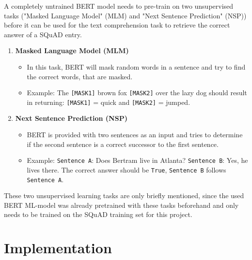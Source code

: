         A completely untrained BERT model needs to pre-train on two unsupervised tasks ("Masked Language Model" (MLM) and "Next Sentence Prediction" (NSP)) before it can be used for the text comprehension task to retrieve the correct answer of a SQuAD entry. 
        
        \begin{enumerate}
            \item \textbf{Masked Language Model (MLM)}
            \begin{itemize}
                \item In this task, BERT will mask random words in a sentence and try to find the correct words, that are masked.
                \item Example: The \texttt{[MASK1]} brown fox \texttt{[MASK2]} over the lazy dog should result in returning: \texttt{[MASK1]} = quick and \texttt{[MASK2]} = jumped.
            \end{itemize}

            \item \textbf{Next Sentence Prediction (NSP)}
            \begin{itemize}
                \item BERT is provided with two sentences as an input and tries to determine if the second sentence is a correct successor to the first sentence.
                \item Example: \texttt{Sentence A}: Does Bertram live in Atlanta? \texttt{Sentence B}: Yes, he lives there. The correct answer should be \texttt{True}, \texttt{Sentence B} follows \texttt{Sentence A}.
            \end{itemize}
        \end{enumerate}
        These two unsupervised learning tasks are only briefly mentioned, since the used BERT ML-model was already pretrained with these tasks beforehand and only needs to be trained on the SQuAD training set for this project.


                
\pagebreak
    \section{Implementation}
    \label{sec:implementation}
            

